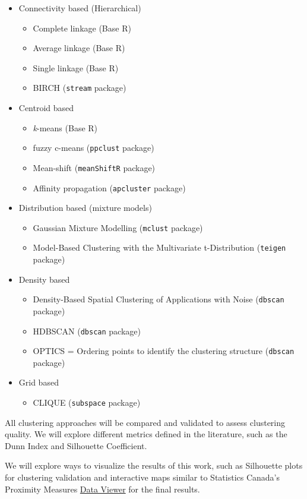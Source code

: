 \documentclass[11pt, a4paper]{article}
\begin{document}
\begin{itemize}
\item Connectivity based (Hierarchical)
\begin{itemize}
	\item Complete linkage (Base R)
	\item Average linkage (Base R)
	\item Single linkage (Base R)
	\item BIRCH (\texttt{stream} package)
\end{itemize}
\item Centroid based
\begin{itemize}
	\item \textit{k}-means (Base R)
	\item fuzzy c-means (\texttt{ppclust} package)
   	\item Mean-shift (\texttt{meanShiftR} package)
   	\item Affinity propagation (\texttt{apcluster} package)
\end{itemize}
\item Distribution based (mixture models)
\begin{itemize}
	\item Gaussian Mixture Modelling (\texttt{mclust} package)
   	\item Model-Based Clustering with the Multivariate t-Distribution (\texttt{teigen} package)
\end{itemize}
\item Density based
\begin{itemize}
	\item Density-Based Spatial Clustering of Applications with Noise (\texttt{dbscan} package)
	\item HDBSCAN (\texttt{dbscan} package)
	\item OPTICS = Ordering points to identify the clustering structure (\texttt{dbscan} package)
\end{itemize}
\item Grid based
\begin{itemize}
	\item CLIQUE (\texttt{subspace} package)
\end{itemize}
\end{itemize}

All clustering approaches will be compared and validated to assess clustering quality. We will explore different metrics defined in the literature, such as the Dunn Index and Silhouette Coefficient.
\par
We will explore ways to visualize the results of this work, such as Silhouette plots for clustering validation and interactive maps similar to Statistics Canada’s Proximity Measures \href{https://www150.statcan.gc.ca/n1/pub/71-607-x/71-607-x2020011-eng.htm}{Data Viewer} for the final results.
\end{document}
